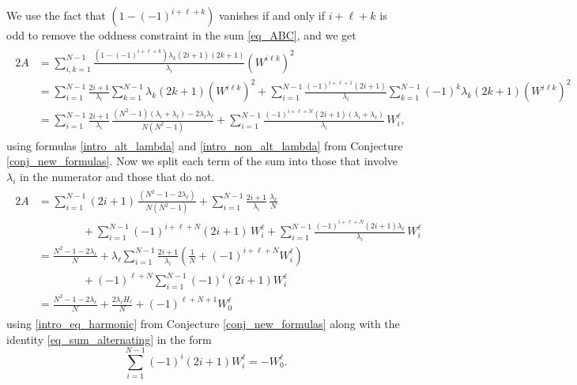 \documentclass[11pt]{amsart}
\numberwithin{equation}{section}
\theoremstyle{definition}
\begin{document}
We use the fact that $(1-(-1)^{i+\ell+k})$ vanishes if and only if $i+\ell+k$ is odd to remove the oddness constraint in the sum \eqref{eq_ABC}, and we get
\begin{gather*}
    \begin{split}
        2A&= \sum_{i,k=1}^{N-1} \frac{(1-(-1)^{i+\ell+k}) \lambda_k(2i+1)(2k+1)}{\lambda_i} (W^{i\ell k})^2 \\
        &= \sum_{i=1}^{N-1} \frac{2i+1}{\lambda_i} \sum_{k=1}^{N-1} \lambda_k(2k+1) (W^{i\ell k})^2 + \sum_{i=1}^{N-1} \frac{(-1)^{i+\ell+1}(2i+1)}{\lambda_i} \sum_{k=1}^{N-1} (-1)^k \lambda_k(2k+1) (W^{i\ell k})^2 \\
        &= \sum_{i=1}^{N-1} \frac{2i+1}{\lambda_i} \, \frac{(N^2-1)(\lambda_i+\lambda_{\ell}) - 2\lambda_i\lambda_{\ell}}{N(N^2-1)}  + \sum_{i=1}^{N-1} \frac{(-1)^{i+\ell+N}(2i+1) (\lambda_i+\lambda_{\ell})}{\lambda_i} \, W^{\ell}_i,
        \end{split}
        \end{gather*}
using formulas \eqref{intro_alt_lambda} and \eqref{intro_non_alt_lambda} from Conjecture \ref{conj_new_formulas}.
Now we split each term of the sum into those that involve $\lambda_i$ in the numerator and those that do not.
        \begin{gather}\label{Aderivation}
            \begin{split}
     2A   &= \sum_{i=1}^{N-1} (2i+1) \, \frac{(N^2-1-2\lambda_{\ell})}{N(N^2-1)}  +
        \sum_{i=1}^{N-1} \frac{2i+1}{\lambda_i} \, \frac{\lambda_{\ell}}{N} \\
        &\qquad\qquad+
        \sum_{i=1}^{N-1} (-1)^{i+\ell+N}(2i+1) \, W^{\ell}_i
        +
        \sum_{i=1}^{N-1} \frac{(-1)^{i+\ell+N}(2i+1) \lambda_{\ell}}{\lambda_i} \, W^{\ell}_i\\
        &= \frac{N^2-1-2\lambda_{\ell}}{N} + \lambda_{\ell} \sum_{i=1}^{N-1} \frac{2i+1}{\lambda_i} \left( \frac{1}{N} + (-1)^{i+\ell+N} W^{\ell}_i\right) \\
        &\qquad\qquad + (-1)^{\ell+N} \sum_{i=1}^{N-1} (-1)^i (2i+1) W^{\ell}_i \\
        &= \frac{N^2-1-2\lambda_{\ell}}{N} + \frac{2\lambda_{\ell} H_{\ell}}{N} + (-1)^{\ell+N+1} W^{\ell}_{0}
    \end{split}
\end{gather}
using \eqref{intro_eq_harmonic} from Conjecture 
\ref{conj_new_formulas} along with the identity  \eqref{eq_sum_alternating} 
in the form 
$$ \sum_{i=1}^{N-1} (-1)^i (2i+1) W^{\ell}_{i} = -W^{\ell}_0.$$
\end{document}
